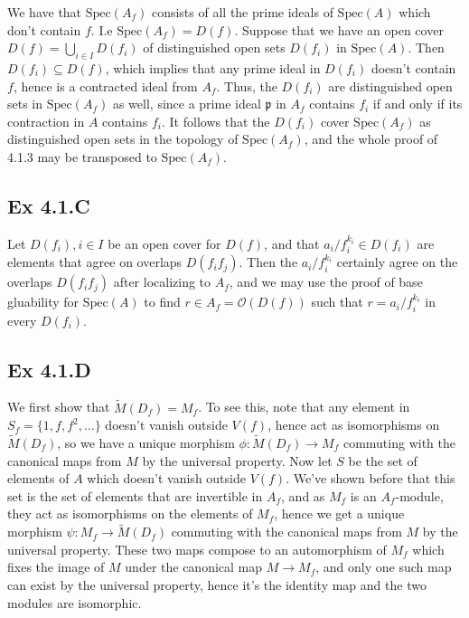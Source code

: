 \documentclass{article}
\theoremstyle{definition}
\newcommand{\Spec}{\text{Spec}}
\begin{document}
We have that $\Spec(A_{f})$ consists of all the prime ideals of $\Spec(A)$
which don't contain $f$. I.e $\Spec(A_{f}) = D(f)$. Suppose that we have an
open cover $D(f) = \bigcup_{i \in I} D(f_i)$ of distinguished open sets
$D(f_i)$ in $\Spec(A)$. Then $D(f_i) \subseteq D(f)$, which implies that any
prime ideal in $D(f_i)$ doesn't contain $f$, hence is a contracted ideal from
$A_f$. Thus, the $D(f_i)$ are distinguished open sets in $\Spec(A_f)$ as well,
since a prime ideal $\mathfrak{p}$ in $A_f$ contains $f_i$ if and only if its
contraction in $A$ contains $f_i$. It follows that the $D(f_i)$ cover
$\Spec(A_f)$ as distinguished open sets in the topology of $\Spec(A_f)$, and
the whole proof of 4.1.3 may be transposed to $\Spec(A_f)$.

\subsection*{Ex 4.1.C}

Let $D(f_i), i \in I$ be an open cover for $D(f)$, and that $a_i/f_i^{k_i} \in
D(f_i)$ are elements that agree on overlaps $D(f_if_j)$. Then the
$a_i/f_i^{k_i}$ certainly agree on the overlaps $D(f_if_j)$ after localizing to
$A_f$, and we may use the proof of base gluability for $\Spec(A)$ to find $r
\in A_f = \mathcal{O}(D(f))$ such that $r = a_i/f_i^{k_i}$ in every $D(f_i)$.

\subsection*{Ex 4.1.D}


We first show that $\widetilde{M}(D_f) = M_{f}$. To see this, note that any
element in $S_{f} = \{1, f, f^2, \ldots \}$ doesn't vanish outside $V(f)$,
hence act as isomorphisms on $\widetilde{M}(D_f)$, so we have a unique morphism
$\phi : \widetilde{M}(D_f) \to M_f$ commuting with the canonical maps from $M$
by the universal property. Now let $S$ be the set of elements of $A$ which
doesn't vanish outside $V(f)$. We've shown before that this set is the set of
elements that are invertible in $A_f$, and as $M_f$ is an $A_f$-module, they
act as isomorphisms on the elements of $M_f$, hence we get a unique morphism
$\psi : M_f \to \widetilde{M}(D_f)$ commuting with the canonical maps from $M$
by the universal property. These two maps compose to an automorphism of $M_f$
which fixes the image of $M$ under the canonical map $M \to M_f$, and only one
such map can exist by the universal property, hence it's the identity map and
the two modules are isomorphic. \\
\end{document}
